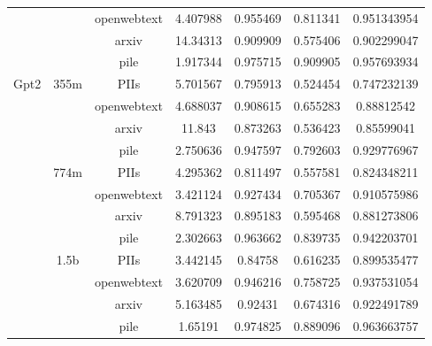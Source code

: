 \begin{table}[ht]
{\begin{tabular}{ccccccc}
\multicolumn{1}{c|}{}                        & \multicolumn{1}{c|}{}                      & openwebtext              & 4.407988 & 0.955469 & 0.811341 & 0.951343954 \\
\multicolumn{1}{c|}{}                        & \multicolumn{1}{c|}{}                      & arxiv                    & 14.34313 & 0.909909 & 0.575406 & 0.902299047 \\
\multicolumn{1}{c|}{}                        & \multicolumn{1}{c|}{}                      & pile                     & 1.917344 & 0.975715 & 0.909905 & 0.957693934 \\ \hline
\multicolumn{1}{c|}{\multirow{12}{*}{Gpt2}}  & \multicolumn{1}{c|}{\multirow{4}{*}{355m}} & PIIs                     & 5.701567 & 0.795913 & 0.524454 & 0.747232139 \\
\multicolumn{1}{c|}{}                        & \multicolumn{1}{c|}{}                      & openwebtext              & 4.688037 & 0.908615 & 0.655283 & 0.88812542  \\
\multicolumn{1}{c|}{}                        & \multicolumn{1}{c|}{}                      & arxiv                    & 11.843   & 0.873263 & 0.536423 & 0.85599041  \\
\multicolumn{1}{c|}{}                        & \multicolumn{1}{c|}{}                      & pile                     & 2.750636 & 0.947597 & 0.792603 & 0.929776967 \\ \cline{2-7} 
\multicolumn{1}{c|}{}                        & \multicolumn{1}{c|}{\multirow{4}{*}{774m}} & PIIs                     & 4.295362 & 0.811497 & 0.557581 & 0.824348211 \\
\multicolumn{1}{c|}{}                        & \multicolumn{1}{c|}{}                      & openwebtext              & 3.421124 & 0.927434 & 0.705367 & 0.910575986 \\
\multicolumn{1}{c|}{}                        & \multicolumn{1}{c|}{}                      & arxiv                    & 8.791323 & 0.895183 & 0.595468 & 0.881273806 \\
\multicolumn{1}{c|}{}                        & \multicolumn{1}{c|}{}                      & pile                     & 2.302663 & 0.963662 & 0.839735 & 0.942203701 \\ \cline{2-7} 
\multicolumn{1}{c|}{}                        & \multicolumn{1}{c|}{\multirow{4}{*}{1.5b}} & PIIs                     & 3.442145 & 0.84758  & 0.616235 & 0.899535477 \\
\multicolumn{1}{c|}{}                        & \multicolumn{1}{c|}{}                      & openwebtext              & 3.620709 & 0.946216 & 0.758725 & 0.937531054 \\
\multicolumn{1}{c|}{}                        & \multicolumn{1}{c|}{}                      & arxiv                    & 5.163485 & 0.92431  & 0.674316 & 0.922491789 \\
\multicolumn{1}{c|}{}                        & \multicolumn{1}{c|}{}                      & pile                     & 1.65191  & 0.974825 & 0.889096 & 0.963663757 \\ \bottomrule[1.5pt]
\end{tabular}
}
\end{table}